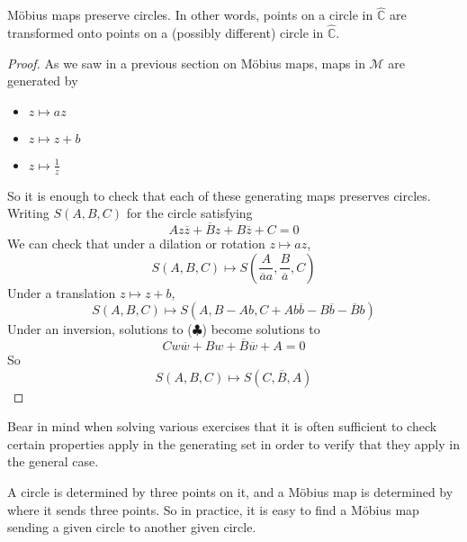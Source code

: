 \begin{theorem}
	M\"obius maps preserve circles. In other words, points on a circle in $\hat{\mathbb C}$ are transformed onto points on a (possibly different) circle in $\hat{\mathbb C}$.
\end{theorem}
\begin{proof}
	As we saw in a previous section on M\"obius maps, maps in $\mathcal M$ are generated by
	\begin{itemize}
		\item $z \mapsto az$
		\item $z \mapsto z + b$
		\item $z \mapsto \frac{1}{z}$
	\end{itemize}
	So it is enough to check that each of these generating maps preserves circles. Writing $S(A, B, C)$ for the circle satisfying
	\[ Az\overline z + \overline B z + B \overline z + C = 0 \tag{$\clubsuit$} \]
	We can check that under a dilation or rotation $z \mapsto az$,
	\[ S(A, B, C) \mapsto S\left( \frac{A}{\overline a a}, \frac{B}{\overline a}, C \right) \]
	Under a translation $z \mapsto z + b$,
	\[ S(A, B, C) \mapsto S\left( A, B-Ab, C+Ab\overline b - B\overline b - \overline B b \right) \]
	Under an inversion, solutions to ($\clubsuit$) become solutions to
	\[ Cw\overline w + Bw + \overline B\overline w + A = 0 \]
	So
	\[ S(A, B, C) \mapsto S(C, \overline B, A) \]
\end{proof}
Bear in mind when solving various exercises that it is often sufficient to check certain properties apply in the generating set in order to verify that they apply in the general case.

\begin{remark}
	A circle is determined by three points on it, and a M\"obius map is determined by where it sends three points. So in practice, it is easy to find a M\"obius map sending a given circle to another given circle.
\end{remark}
